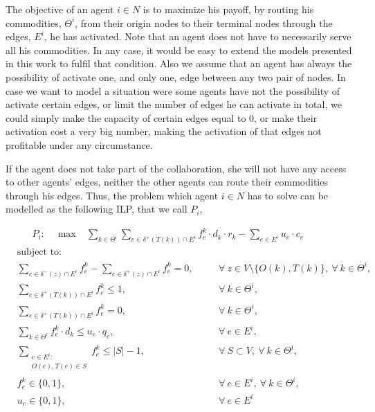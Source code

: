 \documentclass[authoryear]{elsarticle}
\begin{document}
The objective of an agent $i \in N$ is to maximize his payoff, by routing his
commodities, $\Theta^i$, from their origin nodes to their terminal nodes through the edges, $E^i$, he has activated. Note that an agent does not have to necessarily serve all his commodities. In any case, it would be easy to extend the models presented in this work to fulfil that condition. Also we assume that an agent has always the possibility of activate one, and only one, edge between any two pair of nodes. In case we want to model a situation were some agents have not the possibility of activate certain edges, or limit the number of edges he can activate in total, we could simply make the capacity of certain edges equal to 0, or make their activation cost a very big number, making the activation of that edges not profitable under any circumstance. 

If the agent does not take part of the collaboration, she will not have any access to other agents' edges, neither the other agents can route their commodities through his edges. Thus, the problem which agent $i\in N$ has to solve can be modelled as the following ILP, that we call $P_i$,

    \begin{align}
        &  P_i: \quad \max  &  \sum_{k\in \Theta^i} \sum_{e \in \delta^+(T(k))\cap E^i} f_e^k \cdot d_k \cdot r_k - \sum_{e\in E^i} u_e\cdot c_e \hspace{20pt} &&   \label{eq:SingleAgentA}
    \end{align}
    \begin{align}
        & \text{subject to:}       &  \nonumber\\
       & \sum_{e \in \delta^-(z)\cap E^i} f_e^k-\sum_{e \in \delta^+(z)\cap E^i} f_e^k = 0,\quad && \forall\ z\in V\setminus\{O(k),T(k)\},\ \forall\ k\in\Theta^i,  \label{eq:SingleAgentB}\\
        &    \sum_{e \in \delta^+(T(k))\cap E^i} f_e^k \leq 1,  && \forall\ k\in \Theta^i, \label{eq:SingleAgentC} \\
		& \sum_{e \in \delta^+(T(k))\cap E^i} f_e^k= 0,  && \forall\ k\in \Theta^i, \label{eq:SingleAgentD} \\
		& \sum_{k \in \Theta^i} f_e^k \cdot d_k \leq u_e\cdot q_e, && \forall\ e \in E^i,\label{eq:SingleAgentE}  \\
		& \sum_{\substack{e \in E^i\colon \\ O(e),T(e) \in S}} f_e^k \leq |S| -1,   && \forall\ S \subset V,\ \forall\ k \in \Theta^i, \label{eq:SingleAgentF}\\[1em]
		& f_e^k \in \{0,1\},    && \forall\ e \in E^i,\ \forall\ k \in \Theta^i, \label{eq:SingleAgentG} \\ 
		&  u_e   \in \{0,1\},           && \forall\ e \in E^i 
    \end{align}
\end{document}
